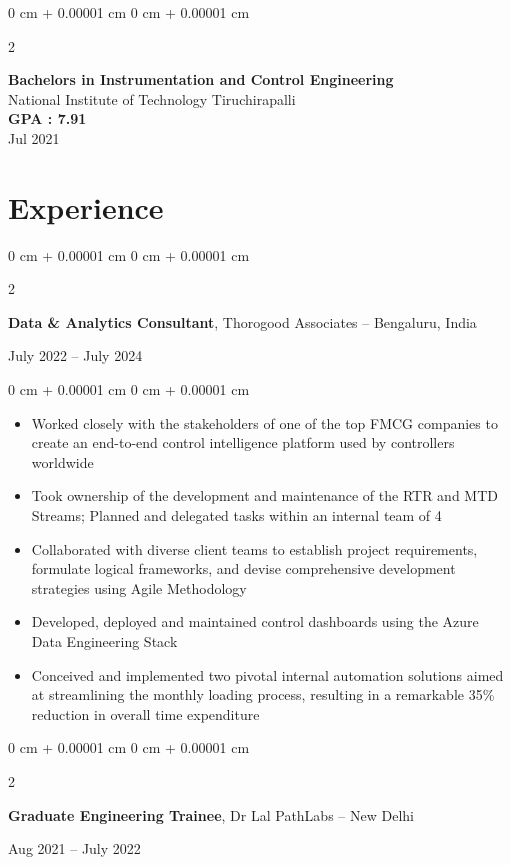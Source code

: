 \documentclass[10pt, letterpaper]{article}
\newenvironment{highlights}{
    \begin{itemize}[
        topsep=0.10 cm,
        parsep=0.10 cm,
        partopsep=0pt,
        itemsep=0pt,
        leftmargin=0 cm + 10pt
    ]
}{
    \end{itemize}
} %
\newenvironment{onecolentry}{
    \begin{adjustwidth}{
        0 cm + 0.00001 cm
    }{
        0 cm + 0.00001 cm
    }
}{
    \end{adjustwidth}
} %
\newenvironment{twocolentry}[2][]{
    \onecolentry
    \def\secondColumn{#2}
    \setcolumnwidth{\fill, 4.5 cm}
    \begin{paracol}{2}
}{
    \switchcolumn \raggedleft \secondColumn
    \end{paracol}
    \endonecolentry
} %
\begin{document}
    \begin{twocolentry}{
        Jul 2021
    }
        \textbf{Bachelors in Instrumentation and Control Engineering} \\
        National Institute of Technology Tiruchirapalli \\
        {\footnotesize \textbf{GPA : 7.91}} \\
    \end{twocolentry}






    \section{Experience}

    \begin{twocolentry}{July 2022 – July 2024}
    \textbf{Data \& Analytics Consultant}, Thorogood Associates -- Bengaluru, India
    \end{twocolentry}
    
    \vspace{0.10 cm}
    \begin{onecolentry}
    \begin{highlights}
        \item Worked closely with the stakeholders of one of the top FMCG companies to create an end-to-end control intelligence platform used by controllers worldwide
        \item Took ownership of the development and maintenance of the RTR and MTD Streams; Planned and delegated tasks within an internal team of 4 
        \item Collaborated with diverse client teams to establish project requirements, formulate logical frameworks, and devise comprehensive development strategies using Agile Methodology
        \item Developed, deployed and maintained control dashboards using the Azure Data Engineering Stack
        \item Conceived and implemented two pivotal internal automation solutions aimed at streamlining the monthly loading process, resulting in a remarkable 35\% reduction in overall time expenditure
    \end{highlights}
    \end{onecolentry}
    
    \vspace{0.2 cm}
    
    \begin{twocolentry}{Aug 2021 – July 2022}
    \textbf{Graduate Engineering Trainee}, Dr Lal PathLabs -- New Delhi
    \end{twocolentry}
    
\end{document}
